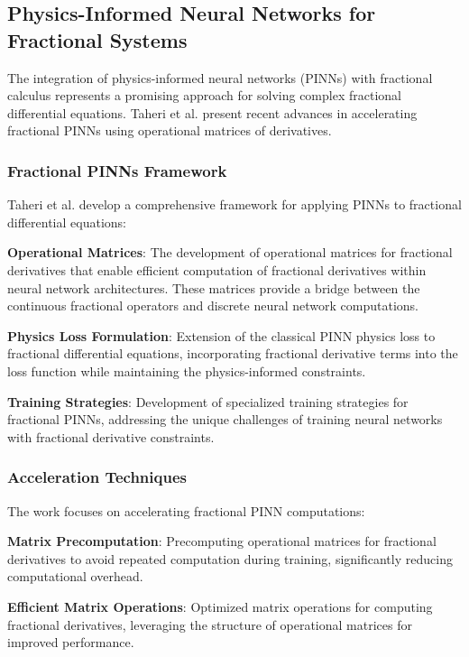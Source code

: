 \subsection{Physics-Informed Neural Networks for Fractional Systems}

The integration of physics-informed neural networks (PINNs) with fractional calculus represents a promising approach for solving complex fractional differential equations. Taheri et al. \cite{Taheri2024AcceleratingFractionalPINNs} present recent advances in accelerating fractional PINNs using operational matrices of derivatives.

\subsubsection{Fractional PINNs Framework}

Taheri et al. develop a comprehensive framework for applying PINNs to fractional differential equations:

\textbf{Operational Matrices}: The development of operational matrices for fractional derivatives that enable efficient computation of fractional derivatives within neural network architectures. These matrices provide a bridge between the continuous fractional operators and discrete neural network computations.

\textbf{Physics Loss Formulation}: Extension of the classical PINN physics loss to fractional differential equations, incorporating fractional derivative terms into the loss function while maintaining the physics-informed constraints.

\textbf{Training Strategies}: Development of specialized training strategies for fractional PINNs, addressing the unique challenges of training neural networks with fractional derivative constraints.

\subsubsection{Acceleration Techniques}

The work focuses on accelerating fractional PINN computations:

\textbf{Matrix Precomputation}: Precomputing operational matrices for fractional derivatives to avoid repeated computation during training, significantly reducing computational overhead.

\textbf{Efficient Matrix Operations}: Optimized matrix operations for computing fractional derivatives, leveraging the structure of operational matrices for improved performance.

